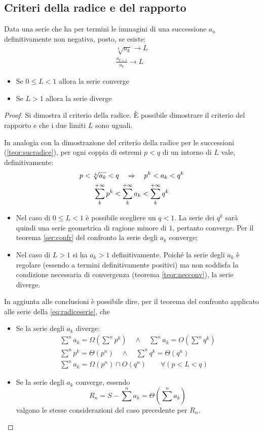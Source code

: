 \subsection{Criteri della radice e del rapporto}
\begin{teor}
	Data una serie che ha per termini le immagini di una successione $a_n$ definitivamente non negativa, posto, se esiste:
	\begin{gather*}
		\sqrt[k]{a_k}\to L\\
		\frac{a_{k+1}}{a_k}\to L
	\end{gather*}
	\begin{itemize}
		\item Se $0\leq L<1$ allora la serie converge
		\item Se $L>1$ allora la serie diverge
	\end{itemize}
\end{teor}
\begin{proof}
	Si dimostra il criterio della radice. È possibile dimostrare il criterio del rapporto e che i due limiti $L$ sono uguali.

	In analogia con la dimostrazione del criterio della radice per le successioni (\vref{teor:sucradice}), per ogni coppia di estremi $p<q$ di un intorno di $L$ vale, definitivamente:
	\begin{gather}
		p<\sqrt[k]{a_k}<q\quad\Rightarrow\quad p^k<a_k<q^k\notag\\
		\label{eq:radiceserie}
		\sum_k^{+\infty}p^k<\sum_k^{+\infty}a_k<\sum_k^{+\infty}q^k
	\end{gather}
	\begin{itemize}
		\item Nel caso di $0\leq L<1$ è possibile scegliere un $q<1$. La serie dei $q^k$ sarà quindi una serie geometrica di ragione minore di $1$, pertanto converge. Per il teorema \ref{ser:confr} del confronto la serie degli $a_k$ converge;
		\item Nel caso di $L>1$ si ha $a_k>1$ definitivamente. Poiché la serie degli $a_k$ è regolare (essendo a termini definitivamente positivi) ma non soddisfa la condizione necessaria di convergenza (teorema \ref{teor:necconv}), la serie diverge.
	\end{itemize}
	In aggiunta alle conclusioni è possibile dire, per il teorema del confronto applicato alle serie della \ref{eq:radiceserie}, che
	\begin{itemize}
		\item Se la serie degli $a_k$ diverge:
		      \begin{gather*}
			      \sum^n a_k=\Omega\left(\sum^n p^k\right)\quad\land\quad \sum^n a_k=O\left(\sum^n q^k\right)\\
			      \sum^n p^k=\Theta(p^n)\quad\land\quad \sum^n q^k=\Theta(q^n)\\
			      \sum^n a_k=\Omega(p^n)\cap O(q^n) \qquad \forall(p<L<q)
		      \end{gather*}
		\item Se la serie degli $a_k$ converge, essendo
		      \[
			      R_n=S-\sum^n a_k=\Theta\left(\sum^n a_k\right)
		      \]
		      valgono le stesse considerazioni del caso precedente per $R_n$.
	\end{itemize}
\end{proof}
